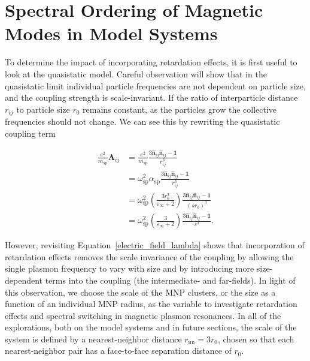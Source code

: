 \documentclass[journal=apchd5,manuscript=article]{achemso}
\begin{document}
\section{Spectral Ordering of Magnetic Modes in Model Systems}

To determine the impact of incorporating retardation effects, it is first useful to look at the quasistatic model. Careful observation will show that in the quasistatic limit individual particle frequencies are not dependent on particle size, and the coupling strength is scale-invariant. If the ratio of interparticle distance $r_{ij}$ to particle size $r_0$ remains constant, as the particles grow the collective frequencies should not change. We can see this by rewriting the quasistatic coupling term

\begin{align}
\frac{e^2}{m_{\textrm{sp}}}\boldsymbol{\Lambda}_{ij} &= \frac{e^2}{m_{\textrm{sp}}}\frac{3\hat{\textbf{n}}_{ij}\hat{\textbf{n}}_{ij} - \textbf{1}}{r_{ij}^3} \\
&= \omega_{\textrm{sp}}^2 \alpha_{\textrm{sp}}\frac{3\hat{\textbf{n}}_{ij}\hat{\textbf{n}}_{ij} - \textbf{1}}{r_{ij}^3} \\
&= \omega_{\textrm{sp}}^2 \left(\frac{3r_0^3}{\varepsilon_{\infty}+2}\right)\frac{3\hat{\textbf{n}}_{ij}\hat{\textbf{n}}_{ij} - \textbf{1}}{(sr_0)^3} \\
&= \omega_{\textrm{sp}}^2 \left(\frac{3}{\varepsilon_{\infty}+2}\right)\frac{3\hat{\textbf{n}}_{ij}\hat{\textbf{n}}_{ij} - \textbf{1}}{s^3}.
\label{quasistatic_coupling}
\end{align}

\noindent However, revisiting Equation~\ref{electric_field_lambda} shows that incorporation of retardation effects removes the scale invariance of the coupling by allowing the single plasmon frequency to vary with size and by introducing more size-dependent terms into the coupling (the intermediate- and far-fields). In light of this observation, we choose the scale of the MNP clusters, or the size as a function of an individual MNP radius, as the variable to investigate retardation effects and spectral switching in magnetic plasmon resonances. In all of the explorations, both on the model systems and in future sections, the scale of the system is defined by a nearest-neighbor distance $r_{\textrm{nn}} = 3r_0$, chosen so that each nearest-neighbor pair has a face-to-face separation distance of $r_0$. 
\end{document}
